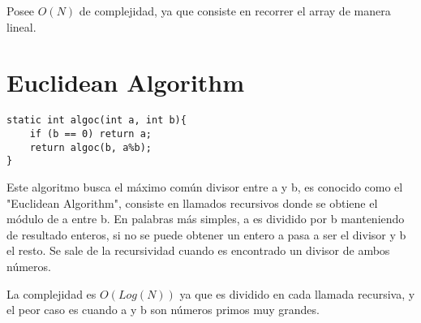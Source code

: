 \documentclass[a4paper,11pt]{article}
\theoremstyle{mytheor}
\begin{document}
Posee $O(N)$ de complejidad, ya que consiste en recorrer el array de manera lineal.

\pagebreak

\section*{Euclidean Algorithm}
\begin{lstlisting}[label={list:second},caption=Algoritmo c.]
static int algoc(int a, int b){
	if (b == 0) return a;
    return algoc(b, a%b);
}
\end{lstlisting}
Este algoritmo busca el máximo común divisor entre a y b, es conocido como el "Euclidean Algorithm", consiste en llamados recursivos donde se obtiene el módulo de a entre b. En palabras más simples, a es dividido por b manteniendo de resultado enteros, si no se puede obtener un entero a pasa a ser el divisor y b el resto. Se sale de la recursividad cuando es encontrado un divisor de ambos números.

La complejidad es $O(Log(N))$ ya que es dividido en cada llamada recursiva, y el peor caso es cuando a y b son números primos muy grandes.
\end{document}
